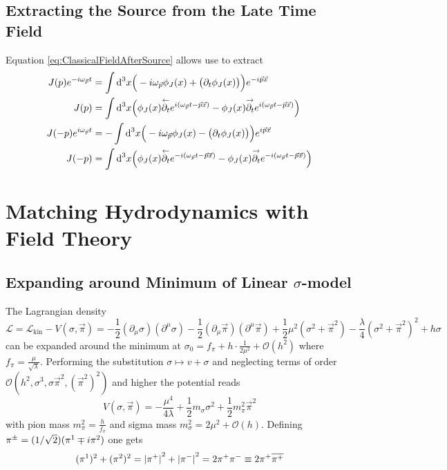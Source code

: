 \subsection{Extracting the Source from the Late Time Field}

Equation \eqref{eq:ClassicalFieldAfterSource} allows use to extract
\begin{subequations}
    \begin{align}        
        J(p)e^{-{i}\omega_{\vec{p}}t}&=\int\text{d}^3x\Big(-{i}\omega_{\vec{p}}\phi_J(x)+\big(\partial_t\phi_J(x)\big)\Big)e^{-{i}\vec{p}\vec{x}}\\
        J(p)&=\int\text{d}^3x\Big(\phi_J(x)\overset{\leftarrow}{\partial_t}e^{{i}(\omega_{\vec{p}}t-\vec{p}\vec{x})}-\phi_J(x)\overset{\rightarrow}{\partial_t}e^{{i}(\omega_{\vec{p}}t-\vec{p}\vec{x})}\Big)\\
        J(-p)e^{{i}\omega_{\vec{p}}t}&=-\int\text{d}^3x\Big(-{i}\omega_{\vec{p}}\phi_J(x)-\big(\partial_t\phi_J(x)\big)\Big)e^{{i}\vec{p}\vec{x}}\\
        J(-p)&=\int\text{d}^3x\Big(\phi_J(x)\overset{\leftarrow}{\partial_t}e^{-{i}(\omega_{\vec{p}}t-\vec{p}\vec{x})}-\phi_J(x)\overset{\rightarrow}{\partial_t}e^{-{i}(\omega_{\vec{p}}t-\vec{p}\vec{x})}\Big)
    \end{align}
    \label{eq:SourceFieldRelation}
\end{subequations} 

\section{Matching Hydrodynamics with Field Theory}

\subsection{Expanding around Minimum of Linear $\sigma$-model}

The Lagrangian density
\begin{equation}
    \mathscr{L}=\mathcal{L}_{\text{kin}}-V(\sigma,\vec{\pi})=-\frac{1}{2}(\partial_\mu\sigma)(\partial^\mu\sigma)-\frac{1}{2}(\partial_\mu\vec{\pi})(\partial^\mu\vec{\pi})+\frac{1}{2}\mu^2(\sigma^2+\vec{\pi}^2)-\frac{\lambda}{4}(\sigma^2+\vec{\pi}^2)^2+h\sigma
\end{equation}
can be expanded around the minimum at $\sigma_0=f_\pi+h\cdot\frac{1}{2\mu^2}+\mathcal{O}(h^2)$ where $f_\pi=\frac{\mu}{\sqrt{\lambda}}$. Performing the substitution $\sigma\mapsto v+\sigma$ and neglecting terms of order $\mathcal{O}(h^2,\sigma^3,\sigma\vec{\pi}^2,(\vec{\pi}^2)^2)$ and higher the potential reads
\begin{equation}
    V(\sigma,\vec{\pi})=-\frac{\mu^4}{4\lambda}+\frac{1}{2}m_\sigma\sigma^2+\frac{1}{2}m_\pi^2\vec{\pi}^2
\end{equation}
with pion mass $m_\pi^2=\frac{h}{f_\pi}$ and sigma mass $m_\sigma^2=2\mu^2+\mathcal{O}(h)$. Defining $\pi^\pm=(1/\sqrt{2})(\pi^1\mp{i}\pi^2)$ one gets 
\begin{equation}
    (\pi^1)^2+(\pi^2)^2={\vert\pi^+\vert}^2+{\vert\pi^-\vert}^2=2\pi^+\pi^-\equiv 2\pi^+\overline{\pi^+}
\end{equation}


